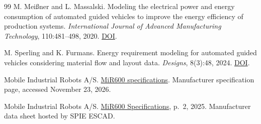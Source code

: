 \documentclass[11pt,a4paper]{article}
\begin{document}
\begin{thebibliography}{99}
M. Mei\ss ner and L. Massalski.
Modeling the electrical power and energy consumption of automated guided
vehicles to improve the energy efficiency of production systems.
\emph{International Journal of Advanced Manufacturing Technology}, 110:481--498, 2020.
\href{https://doi.org/10.1007/s00170-020-05796-8}{DOI}.

M. Sperling and K. Furmans.
Energy requirement modeling for automated guided vehicles considering material
flow and layout data. \emph{Designs}, 8(3):48, 2024.
\href{https://doi.org/10.3390/designs8030048}{DOI}.

Mobile Industrial Robots A/S.
\href{https://mobile-industrial-robots.com/it/prodotti/robot/mir600/specifiche}{MiR600 specifications}.
Manufacturer specification page, accessed November 23, 2026.

Mobile Industrial Robots A/S.
\href{https://www.spie-escad.de/wp-content/uploads/MiR600-Specifications-2.96.pdf}{MiR600 Specifications}, p.~2, 2025.
Manufacturer data sheet hosted by SPIE ESCAD.
\end{thebibliography}
\end{document}
